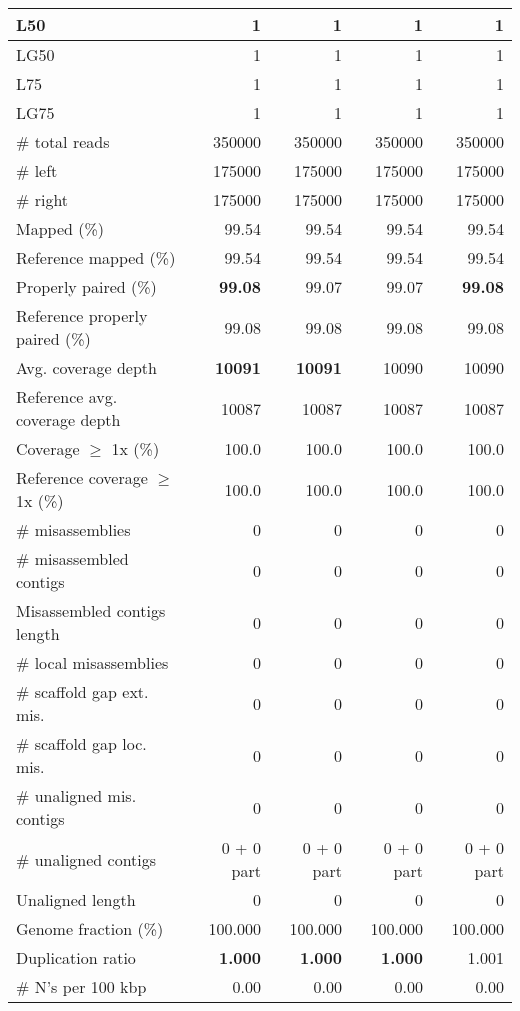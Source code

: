 \documentclass[12pt,a4paper]{article}
\begin{document}
\begin{table}[ht]
\begin{center}
\begin{tabular}{|l*{4}{|r}|}
L50 & 1 & 1 & 1 & 1 \\ \hline
LG50 & 1 & 1 & 1 & 1 \\ \hline
L75 & 1 & 1 & 1 & 1 \\ \hline
LG75 & 1 & 1 & 1 & 1 \\ \hline
\# total reads & 350000 & 350000 & 350000 & 350000 \\ \hline
\# left & 175000 & 175000 & 175000 & 175000 \\ \hline
\# right & 175000 & 175000 & 175000 & 175000 \\ \hline
Mapped (\%) & 99.54 & 99.54 & 99.54 & 99.54 \\ \hline
Reference mapped (\%) & 99.54 & 99.54 & 99.54 & 99.54 \\ \hline
Properly paired (\%) & {\bf 99.08} & 99.07 & 99.07 & {\bf 99.08} \\ \hline
Reference properly paired (\%) & 99.08 & 99.08 & 99.08 & 99.08 \\ \hline
Avg. coverage depth & {\bf 10091} & {\bf 10091} & 10090 & 10090 \\ \hline
Reference avg. coverage depth & 10087 & 10087 & 10087 & 10087 \\ \hline
Coverage $\geq$ 1x (\%) & 100.0 & 100.0 & 100.0 & 100.0 \\ \hline
Reference coverage $\geq$ 1x (\%) & 100.0 & 100.0 & 100.0 & 100.0 \\ \hline
\# misassemblies & 0 & 0 & 0 & 0 \\ \hline
\# misassembled contigs & 0 & 0 & 0 & 0 \\ \hline
Misassembled contigs length & 0 & 0 & 0 & 0 \\ \hline
\# local misassemblies & 0 & 0 & 0 & 0 \\ \hline
\# scaffold gap ext. mis. & 0 & 0 & 0 & 0 \\ \hline
\# scaffold gap loc. mis. & 0 & 0 & 0 & 0 \\ \hline
\# unaligned mis. contigs & 0 & 0 & 0 & 0 \\ \hline
\# unaligned contigs & 0 + 0 part & 0 + 0 part & 0 + 0 part & 0 + 0 part \\ \hline
Unaligned length & 0 & 0 & 0 & 0 \\ \hline
Genome fraction (\%) & 100.000 & 100.000 & 100.000 & 100.000 \\ \hline
Duplication ratio & {\bf 1.000} & {\bf 1.000} & {\bf 1.000} & 1.001 \\ \hline
\# N's per 100 kbp & 0.00 & 0.00 & 0.00 & 0.00 \\ \hline

\end{tabular}
\end{center}
\end{table}
\end{document}
